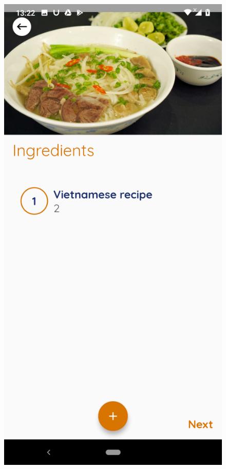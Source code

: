 \documentclass{article}
\begin{document}
\begin{figure}[h!]
    \includegraphics[scale=0.1]{Images/pho_ingre.jpg}

\end{figure}
\end{document}
